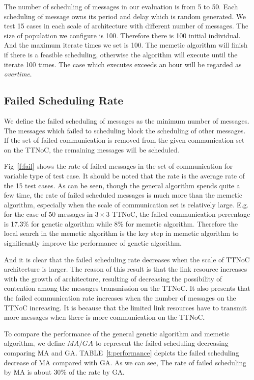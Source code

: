\documentclass[journal]{IEEEtran}
\begin{document}
The number of scheduling of messages in our evaluation is from 5 to 50.
Each scheduling of message owns its period and delay which is random generated.
We test 15 cases in each scale of architecture with different number of messages.
The size of population we configure is 100.
Therefore there is 100 initial individual.
And the maximum iterate times we set is 100.
The memetic algorithm will finish if there is a feasible scheduling,
 otherwise the algorithm will execute until the iterate 100 times.
The case which executes exceeds an hour will be regarded as \emph{overtime}.

\subsection{Failed Scheduling Rate}
We define the failed scheduling of messages as the minimum number of messages.
The messages which failed to scheduling block the scheduling of other messages.
If the set of failed communication is removed from the given communication set on the TTNoC,
 the remaining messages will be scheduled.

Fig~\ref{f:fail} shows the rate of failed messages in the set of communication for variable type of test case. 
It should be noted that the rate is the average rate of the 15 test cases.
As can be seen,
 though the general algorithm spends quite a few time,
  the rate of failed scheduled messages is much more than the memetic algorithm, especially when the scale of communication set is relatively large.
E.g. for the case of 50 messages in $3\times 3$ TTNoC,
 the failed communication percentage is 17.3\% for genetic algorithm while 8\% for memetic algorithm.
  Therefore the local search in the memetic algorithm is the key step in memetic algorithm to significantly improve the performance of genetic algorithm.

And it is clear that the failed scheduling rate decreases when the scale of TTNoC architecture is larger. 
The reason of this result is that the link resource increases with the growth of architecture,
 resulting of decreasing the possibility of contention among the messages transmission on the TTNoC.
It also presents that the failed communication rate increases when the number of messages on the TTNoC increasing.
It is because that the limited link resources have to transmit more messages when there is more communication on the TTNoC.

To compare the performance of the general genetic algorithm and memetic algorithm,
 we define $MA/GA$ to represent the failed scheduling decreasing comparing MA and GA.
TABLE~\ref{t:performance} depicts the failed scheduling decrease of MA compared with GA.
As we can see, The rate of failed scheduling by MA is about 30\% of the rate by GA.
\end{document}
